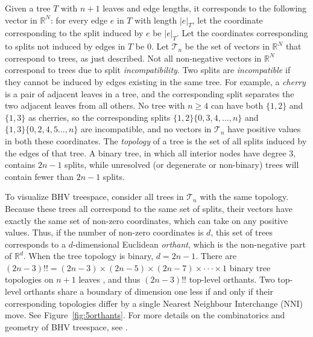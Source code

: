 \documentclass[12pt,letterpaper]{article}
\theoremstyle{plain}
\theoremstyle{definition}
\newcommand\RR{\mathbb{R}}
\newcommand\cT{\mathcal{T}}
\begin{document}
Given a tree $T$ with $n + 1$ leaves and edge lengths, it corresponds to the following vector in $\mathbb{R}^N$:  for every edge $e$ in $T$ with length $|e|_T$, let the coordinate corresponding to the split induced by $e$ be $|e|_T$.  Let the coordinates corresponding to splits not induced by edges in $T$ be 0.  Let $\cT_n$ be the set of vectors in $\mathbb{R}^N$ that correspond to trees, as just described.  Not all non-negative vectors in $\mathbb{R}^N$ correspond to trees due to split \emph{incompatibility}.  Two splits are \emph{incompatible} if they cannot be induced by edges existing in the same tree.  For example, a \emph{cherry} is a pair of adjacent leaves in a tree, and the corresponding split separates the two adjacent leaves from all others.  No tree with $n \ge 4$ can have both $\{1,2\}$ and $\{1,3\}$ as cherries, so the corresponding splits $\{1,2\}\{0,3, 4, ..., n\}$ and $\{1,3\}\{0,2, 4, 5 ..., n\}$ are incompatible, and no vectors in $\cT_n$ have positive values in both these coordinates.  
The \emph{topology} of a tree is the set of all splits induced by the edges of that tree.  A binary tree, in which all interior nodes have degree 3, contains $2n-1$ splits, while unresolved (or degenerate or non-binary) trees will contain fewer than $2n-1$ splits. 

To visualize BHV treespace, consider all trees in $\cT_n$ with the same topology.  Because these trees all correspond to the same set of splits, their vectors have exactly the same set of non-zero coordinates, which can take on any positive values.  Thus, if the number of non-zero coordinates is $d$, this set of trees corresponds to a $d$-dimensional Euclidean \emph{orthant}, which is the non-negative part of $\RR^d$.   When the tree topology is binary, $d = 2n-1$.
There are $(2n-3)!! = (2n-3)\times (2n-5)\times (2n-7) \times \cdot \cdot \cdot \times 1$ binary tree topologies on $n+1$ leaves \citep{Schroder1870}, and thus $(2n-3)!!$ top-level orthants.  Two top-level orthants share a boundary of dimension one less if and only if their corresponding topologies differ by a single Nearest Neighbour Interchange (NNI) move. See Figure~\ref{fig:5orthants}. For more details on the combinatorics and geometry of BHV treespace, see \citet{BHV01}.
\end{document}
